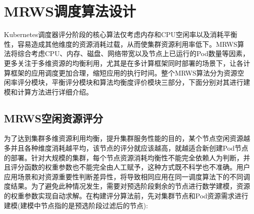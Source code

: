 \section{MRWS调度算法设计}
Kubernetes调度器评分阶段的核心算法仅考虑内存和CPU空闲率以及消耗平衡性，容易造成其他维度的资源消耗过载，从而使集群资源利用率低下。MRWS算法将综合考虑CPU、内存、磁盘、网络带宽以及节点上已运行的Pod数量等因素，更多关注于多维资源的均衡利用，尤其是在多计算框架同时部署的场景下，让各计算框架的应用调度更加合理，缩短应用的执行时间。整个MRWS算法分为资源空闲率评分模块，平衡评分模块和算法均衡度评价模块三部分，下面分别对其进行建模和计算方法进行详细介绍。

\subsection{MRWS空闲资源评分}
为了达到集群多维资源利用均衡，提升集群服务性能的目的，某个节点空闲资源越多并且各种维度消耗越平均，该节点的评分就应该越高，就越适合新创建Pod节点的部署。针对大规模的集群，每个节点资源消耗均衡性不能完全依赖人为判断，并且评分函数的权重参数也不能完全由人工赋予，这种方式既不科学也不准确。用户应用场景和对资源重要性判断差异性，将导致相同应用在同一调度算法下的不同调度结果。为了避免此种情况发生，需要对预选阶段剩余的节点进行数学建模，资源的权重参数实现自动求解。在构建评分算法前，先对集群节点和Pod资源需求进行建模(建模中节点指的是预选阶段过滤后的节点):
